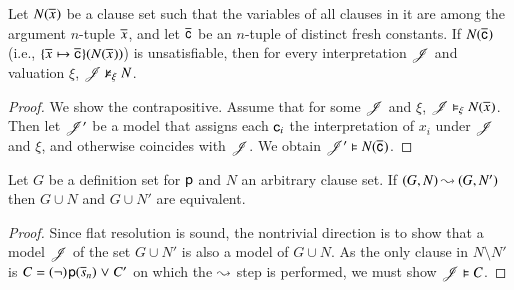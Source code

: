 \newcommand{\mm}{\ourmodel}
\newcommand{\notmodels}{\nvDash}
\begin{rep}
   \begin{lemma}
   \label{lem:unsat-fresh-consts}
   Let $N(\overline{x}_{})$ be a clause set such that the variables of all
   clauses in it are among the argument $n$-tuple $\overline{x}_{}$, and let
   $\overline{\mathsf{c}}_{}$ be an $n$-tuple of distinct fresh constants. If
   $N(\overline{\mathsf{c}}_{})$ {\upshape(}i.e.,
   $\{\overline{x}_{}\mapsto\overline{\mathsf{c}}_{}\}(N(\overline{x}_{}))${\upshape)} is
   unsatisfiable, then for every interpretation $\mm$ and valuation $\xi$,
   $\mm \notmodels_\xi N$.
   \end{lemma}
   \begin{proof}
      We show the contrapositive. Assume that for some $\mm$ and $\xi$,  $\mm \models_\xi N(\tupleempty{x})$.
      Then let $\mathscr{J}'$
      be a model that assigns each $\mathsf{c}_i$ the interpretation of $x_i$ under $\mm$ and $\xi$, and otherwise
      coincides with $\mathscr{J}$. We obtain $\mathscr{J}' \vDash N(\overline{\mathsf{c}}_{})$.
   \end{proof}

   \begin{lemma}
      \label{lem:flat-res-set-step-satisfiability}
      Let $G$ be a definition set for $\mathsf{p}$\confrep{,}{} and $N$ an arbitrary clause
      set. If $(G, N) \mathbin\leadsto (G, N')$ then $G \cup N$ and $G \cup N'$ are
      equivalent.
   \end{lemma}
   \begin{proof}
      Since flat resolution is sound, the nontrivial direction is to show that a
      model $\mm$ of the set $G \cup N'$ is also a model of $G \cup N$. As the only clause in $N
      \setminus N'$ is $C = (\neg)\kern.2ex{\mathsf{p}(\overline{s}_{n})} \mathrel{\lor} C'$ on which
      the $\mathbin\leadsto$ step is performed, we must show $\mm \models C$.



\end{proof}
\end{rep}
